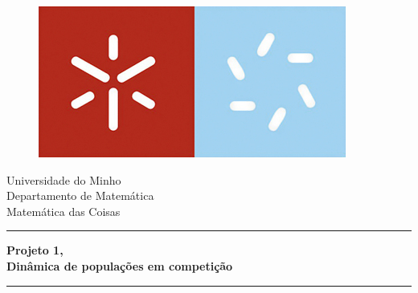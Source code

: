 


\begin{titlepage}
\begin{figure}[!htb]
    \centering
    \includegraphics[keepaspectratio=true,scale=0.75]{umfinal.jpg}
\end{figure}

\begin{center}
    \LARGE{Universidade do Minho\\Departamento de Matemática\\Matemática das Coisas}
\end{center}

\vspace{10mm}
\begin{center}
\noindent\rule{13cm}{0.4pt} \linebreak
    {\LARGE{\bf Projeto 1,\\\vspace{5mm}Dinâmica de populações em competição}} \linebreak  
\noindent\rule{13cm}{0.4pt} \linebreak
\end{center}
\vspace{10mm}


\end{titlepage}
